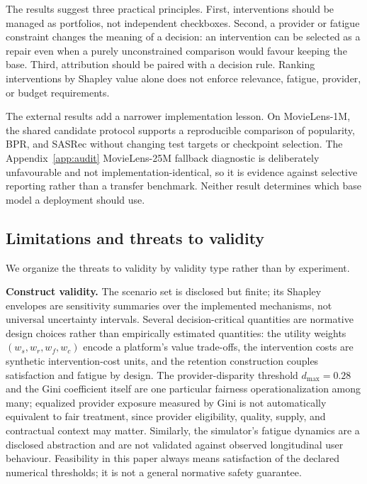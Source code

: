 \documentclass[review]{elsarticle}
\theoremstyle{plain}
\theoremstyle{definition}
\theoremstyle{remark}
\begin{document}
The results suggest three practical principles. First, interventions should be managed as portfolios, not independent checkboxes. Second, a provider or fatigue constraint changes the meaning of a decision: an intervention can be selected as a repair even when a purely unconstrained comparison would favour keeping the base. Third, attribution should be paired with a decision rule. Ranking interventions by Shapley value alone does not enforce relevance, fatigue, provider, or budget requirements.

The external results add a narrower implementation lesson. On MovieLens-1M, the shared candidate protocol supports a reproducible comparison of popularity, BPR, and SASRec without changing test targets or checkpoint selection. The Appendix~\ref{app:audit} MovieLens-25M fallback diagnostic is deliberately unfavourable and not implementation-identical, so it is evidence against selective reporting rather than a transfer benchmark. Neither result determines which base model a deployment should use.

\subsection{Limitations and threats to validity}\label{sec:limitations}

We organize the threats to validity by validity type rather than by experiment.

\textbf{Construct validity.} The scenario set is disclosed but finite; its Shapley envelopes are sensitivity summaries over the implemented mechanisms, not universal uncertainty intervals. Several decision-critical quantities are normative design choices rather than empirically estimated quantities: the utility weights $(w_s,w_r,w_f,w_c)$ encode a platform's value trade-offs, the intervention costs are synthetic intervention-cost units, and the retention construction couples satisfaction and fatigue by design. The provider-disparity threshold $d_{\max}=0.28$ and the Gini coefficient itself are one particular fairness operationalization among many; equalized provider exposure measured by Gini is not automatically equivalent to fair treatment, since provider eligibility, quality, supply, and contractual context may matter. Similarly, the simulator's fatigue dynamics are a disclosed abstraction and are not validated against observed longitudinal user behaviour. Feasibility in this paper always means satisfaction of the declared numerical thresholds; it is not a general normative safety guarantee.
\end{document}
